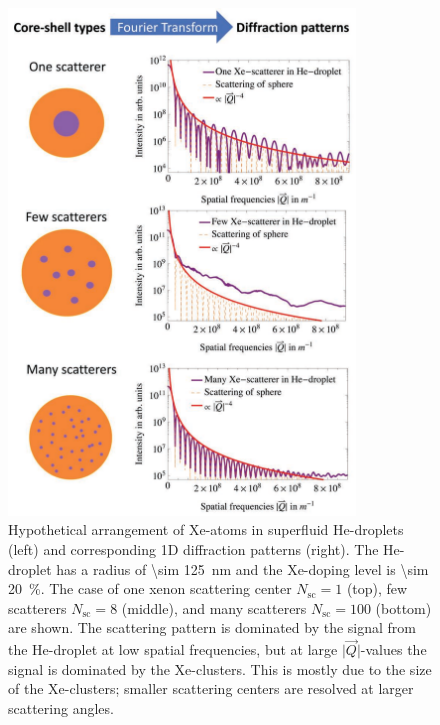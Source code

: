 \begin{figure}
 	\centering
 		\includegraphics[width=0.82\textwidth]{images/results/plum-pudding1.pdf}
 	\caption[Hypothetical arrangement of Xe-clusters within He-droplets.]{Hypothetical arrangement of Xe-atoms in superfluid He-droplets (left) and corresponding 1D diffraction patterns (right). The He-droplet has a radius of \SI{\sim 125}{\nano\meter} and the Xe-doping level is \SI{\sim 20}{\percent}. The case of one xenon scattering center $N_{\text{sc}}=1$ (top), few scatterers $N_{\text{sc}}=8$ (middle), and many scatterers $N_{\text{sc}}=100$ (bottom) are shown. The scattering pattern is dominated by the signal from the He-droplet at low spatial frequencies, but at large $\lvert\vec{Q}\rvert$-values the signal is dominated by the Xe-clusters. This is mostly due to the size of the Xe-clusters; smaller scattering centers are resolved at larger scattering angles.}
 	\label{fig:HeXe-plum-pudding}
\end{figure}
